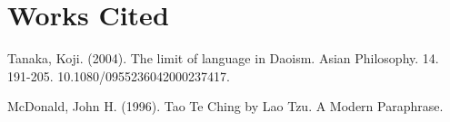 \section*{\centering Works Cited}

Tanaka, Koji. (2004). The limit of language in Daoism. Asian Philosophy. 14. 191-205. 10.1080/0955236042000237417.

McDonald, John H. (1996). Tao Te Ching by Lao Tzu. A Modern Paraphrase.

